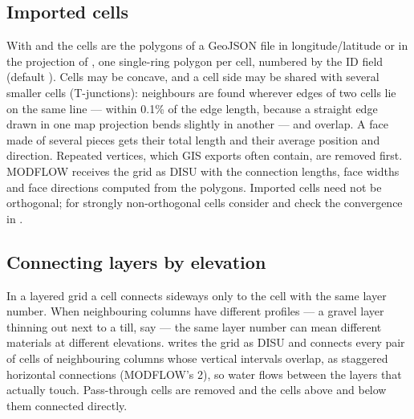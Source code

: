 \subsection{Imported cells}
With  and  the cells are the polygons of a GeoJSON file in
longitude/latitude or in the projection of , one single-ring polygon per cell, numbered by the ID field (default ). Cells may be
concave, and a cell side may be shared with several smaller cells (T-junctions): neighbours are found wherever edges of two
cells lie on the same line --- within 0.1\% of the edge length, because a straight edge drawn in one map projection bends
slightly in another --- and overlap. A face made of several pieces gets their total length and their average position and
direction. Repeated vertices, which GIS exports often contain, are removed first. MODFLOW receives the grid as DISU with the
connection lengths, face widths and face directions computed from the polygons. Imported cells need not be orthogonal; for strongly non-orthogonal cells consider
 and check the convergence in .

\subsection{Connecting layers by elevation}\label{sec:layerconn}
In a layered grid a cell connects sideways only to the cell with the same layer number. When neighbouring columns have
different profiles --- a gravel layer thinning out next to a till, say --- the same layer number can mean different
materials at different elevations.  writes the grid as DISU and connects every pair of
cells of neighbouring columns whose vertical intervals overlap, as staggered horizontal connections (MODFLOW's 
2), so water flows between the layers that actually touch. Pass-through cells are removed and the cells above and below
them connected directly.

